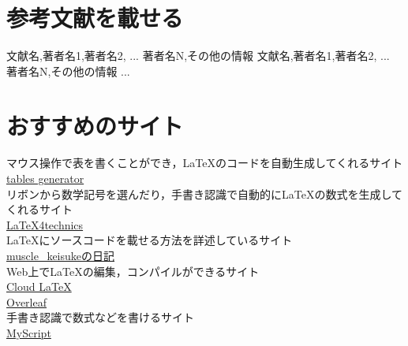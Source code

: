 \documentclass[a4j,titlepage,dvipdfmx,uplatex]{jsarticle}   %
\begin{document}
\resizebox{\columnwidth}{!}{\centering}

\section{参考文献を載せる}
\begin{thebibliography}{99}
  \bibitem[hoge] 文献名,著者名1,著者名2, ... 著者名N,その他の情報
  \bibitem[fuga] 文献名,著者名1,著者名2, ... 著者名N,その他の情報
  ...
\end{thebibliography}
\appendix
\section{おすすめのサイト}
マウス操作で表を書くことができ，\LaTeX のコードを自動生成してくれるサイト \\
\href{http://www.tablesgenerator.com/latex_tables}{tables generator} \\
リボンから数学記号を選んだり，手書き認識で自動的に\LaTeX の数式を生成してくれるサイト \\
\href{https://www.latex4technics.com/}{LaTeX4technics} \\
\LaTeX にソースコードを載せる方法を詳述しているサイト \\
\href{http://muscle-keisuke.hatenablog.com/}{muscle\_keisukeの日記} \\
Web上で\LaTeX の編集，コンパイルができるサイト \\
\href{https://cloudlatex.io/}{Cloud LaTeX} \\
\href{https://www.overleaf.com/}{Overleaf} \\
手書き認識で数式などを書けるサイト \\
\href{https://webdemo.myscript.com/index.html}{MyScript}
\end{document}
